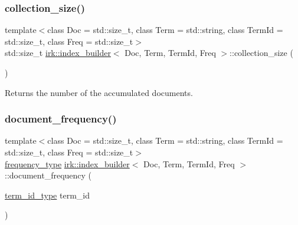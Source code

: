\mbox{\label{classirk_1_1index__builder_a1acc084abede3f0d143448f9c0f96b7b}} 
\subsubsection{\texorpdfstring{collection\+\_\+size()}{collection\_size()}}
{\footnotesize\ttfamily template$<$class Doc  = std\+::size\+\_\+t, class Term  = std\+::string, class Term\+Id  = std\+::size\+\_\+t, class Freq  = std\+::size\+\_\+t$>$ \\
std\+::size\+\_\+t \mbox{\hyperlink{classirk_1_1index__builder}{irk\+::index\+\_\+builder}}$<$ Doc, Term, Term\+Id, Freq $>$\+::collection\+\_\+size (\begin{DoxyParamCaption}{ }\end{DoxyParamCaption})\hspace{0.3cm}{\ttfamily [inline]}}



Returns the number of the accumulated documents. 

\mbox{\label{classirk_1_1index__builder_ab760ed3512980d0d76395b21b354f45a}} 
\subsubsection{\texorpdfstring{document\+\_\+frequency()}{document\_frequency()}}
{\footnotesize\ttfamily template$<$class Doc  = std\+::size\+\_\+t, class Term  = std\+::string, class Term\+Id  = std\+::size\+\_\+t, class Freq  = std\+::size\+\_\+t$>$ \\
\mbox{\hyperlink{classirk_1_1index__builder_af2efa68fc3f10fd9cb000d16279bfbb1}{frequency\+\_\+type}} \mbox{\hyperlink{classirk_1_1index__builder}{irk\+::index\+\_\+builder}}$<$ Doc, Term, Term\+Id, Freq $>$\+::document\+\_\+frequency (\begin{DoxyParamCaption}\item[{\mbox{\hyperlink{classirk_1_1index__builder_a6736f4a9aa142d3ca15c5e8c3b0a352f}{term\+\_\+id\+\_\+type}}}]{term\+\_\+id }\end{DoxyParamCaption})\hspace{0.3cm}{\ttfamily [inline]}}



